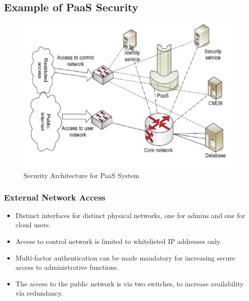 \documentclass{article}
\begin{document}
\subsection{Example of PaaS Security}

\begin{figure}[!h]
    \centering
    \includegraphics[scale=0.7]{p2.png}
    \caption{Security Architecture for PaaS System}
    \label{fig:my_label_2}
\end{figure}

\subsubsection{External Network Access}
\begin{itemize}
    \item Distinct interfaces for distinct physical networks, one for admins and one for cloud users. 
    
    \item Access to control network is limited to whitelisted IP addresses only. 
    
    \item Multi-factor authentication can be made mandatory for increasing secure access to administrative functions. 
    
    \item The access to the public network is via two switches, to increase availability via redundancy.
\end{itemize}
\end{document}
